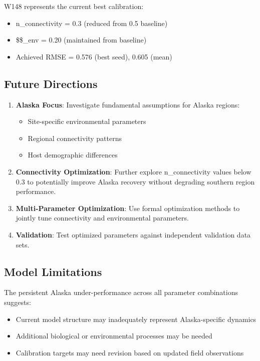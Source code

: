 \documentclass[11pt]{article}
\begin{document}
W148 represents the current best calibration:
\begin{itemize}
\item n\_connectivity = 0.3 (reduced from 0.5 baseline)
\item \$\alpha\$\_env = 0.20 (maintained from baseline)
\item Achieved RMSE = 0.576 (best seed), 0.605 (mean)
\end{itemize}

\subsection{Future Directions}

\begin{enumerate}
\item \textbf{Alaska Focus}: Investigate fundamental assumptions for Alaska regions:
   \begin{itemize}
   \item Site-specific environmental parameters
   \item Regional connectivity patterns
   \item Host demographic differences
   \end{itemize}

\item \textbf{Connectivity Optimization}: Further explore n\_connectivity values below 0.3 to potentially improve Alaska recovery without degrading southern region performance.

\item \textbf{Multi-Parameter Optimization}: Use formal optimization methods to jointly tune connectivity and environmental parameters.

\item \textbf{Validation}: Test optimized parameters against independent validation data sets.
\end{enumerate}

\subsection{Model Limitations}

The persistent Alaska under-performance across all parameter combinations suggests:
\begin{itemize}
\item Current model structure may inadequately represent Alaska-specific dynamics
\item Additional biological or environmental processes may be needed
\item Calibration targets may need revision based on updated field observations
\end{itemize}
\end{document}
